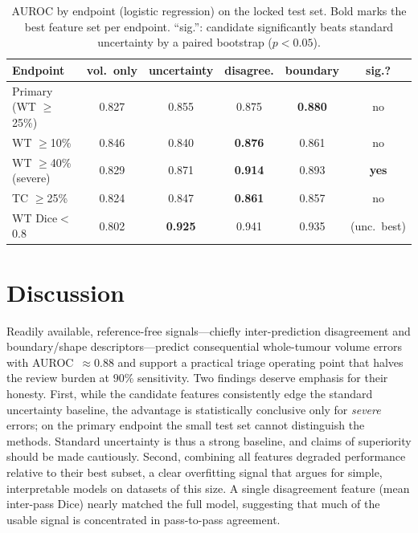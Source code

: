 \documentclass[11pt]{article}
\begin{document}
\begin{table}[htbp]
\centering
\caption{AUROC by endpoint (logistic regression) on the locked test set. Bold marks the
best feature set per endpoint. ``sig.'': candidate significantly beats standard
uncertainty by a paired bootstrap ($p<0.05$).}
\label{tab:secondary}
\begin{tabular}{lccccc}
\toprule
Endpoint & vol.\ only & uncertainty & disagree. & boundary & sig.? \\
\midrule
Primary (WT $\geq$25\%)      & 0.827 & 0.855 & 0.875 & \textbf{0.880} & no \\
WT $\geq$10\%                & 0.846 & 0.840 & \textbf{0.876} & 0.861 & no \\
WT $\geq$40\% (severe)       & 0.829 & 0.871 & \textbf{0.914} & 0.893 & \textbf{yes} \\
TC $\geq$25\%                & 0.824 & 0.847 & \textbf{0.861} & 0.857 & no \\
WT Dice$<$0.8                & 0.802 & \textbf{0.925} & 0.941 & 0.935 & (unc.\ best) \\
\bottomrule
\end{tabular}
\end{table}

\section{Discussion}
Readily available, reference-free signals---chiefly inter-prediction disagreement and
boundary/shape descriptors---predict consequential whole-tumour volume errors with
AUROC~$\approx 0.88$ and support a practical triage operating point that halves the
review burden at $90\%$ sensitivity. Two findings deserve emphasis for their honesty.
First, while the candidate features consistently edge the standard uncertainty baseline,
the advantage is statistically conclusive only for \emph{severe} errors; on the primary
endpoint the small test set cannot distinguish the methods. Standard uncertainty is thus
a strong baseline, and claims of superiority should be made cautiously. Second,
combining all features degraded performance relative to their best subset, a clear
overfitting signal that argues for simple, interpretable models on datasets of this
size. A single disagreement feature (mean inter-pass Dice) nearly matched the full
model, suggesting that much of the usable signal is concentrated in pass-to-pass
agreement.

\end{document}
